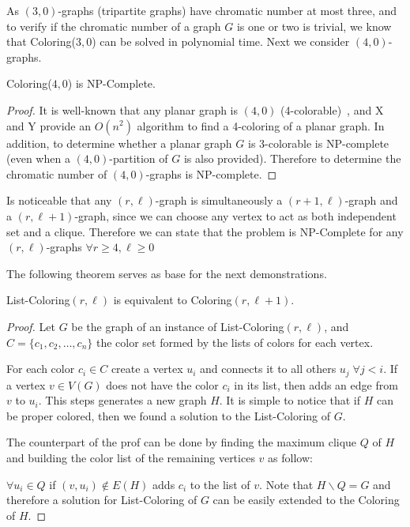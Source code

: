 \documentclass[9pt]{../document-types/entcs} \usepackage{../document-types/entcsmacro}
\begin{document}
As $(3,0)$-graphs (tripartite graphs) have chromatic number at most three, and to verify if the chromatic number of a graph $G$
is one or two is trivial, we know that {\sc Coloring($3,0$)} can be solved in polynomial time.
Next we consider $(4,0)$-graphs.

\begin{lemma}
{\sc Coloring($4,0$)} is NP-Complete.
\end{lemma}
\begin{proof}
It is well-known that any planar graph is $(4,0)$ (4-colorable)~\cite{appel77}, and X and Y provide an $O(n^2)$ algorithm to find a 4-coloring of a planar graph.
In addition, to determine whether a planar graph $G$ is 3-colorable is NP-complete~\cite{larry} (even when a $(4,0)$-partition of $G$ is also provided).
Therefore to determine the chromatic number of $(4,0)$-graphs is NP-complete.
\end{proof}

Is noticeable that any $(r,\ell)$-graph is simultaneously a $(r+1,\ell)$-graph and a $(r,\ell+1)$-graph, since we can choose any vertex to act as both independent set and a clique. Therefore we can state that the problem is NP-Complete for any $(r,\ell)$-graphs $\forall r \geq 4 , \ell \geq 0$

The following theorem serves as base for the next demonstrations.

\begin{theorem}
  {\sc List-Coloring$(r,\ell)$} is equivalent to {\sc Coloring$(r,\ell+1)$}.
\end{theorem}
\begin{proof}
    Let $G$ be the graph of an instance of {\sc List-Coloring$(r,\ell)$}, and $C=\{c_1,c_2,\ldots,c_n\}$ the color set formed by the lists of colors for each vertex.

    For each color $c_i \in C$ create a vertex $u_i$ and connects it to all others $u_j\; \forall j < i$. If a vertex $v \in V(G)$ does not have the color $c_i$ in its list, then adds an edge from $v$ to $u_i$. This steps generates a new graph $H$. It is simple to notice that if $H$ can be proper colored, then we found a solution to the {\sc List-Coloring} of $G$.

    The counterpart of the prof can be done by finding the maximum clique $Q$ of $H$ and building the color list of the remaining vertices $v$ as follow:

    $\forall u_i \in Q$ if $(v,u_i) \notin E(H)$ adds $c_i$ to the list of $v$. Note that $H\backslash Q = G$ and therefore a solution for {\sc List-Coloring} of $G$ can be easily extended to the {\sc Coloring} of $H$.
\end{proof}
\end{document}
